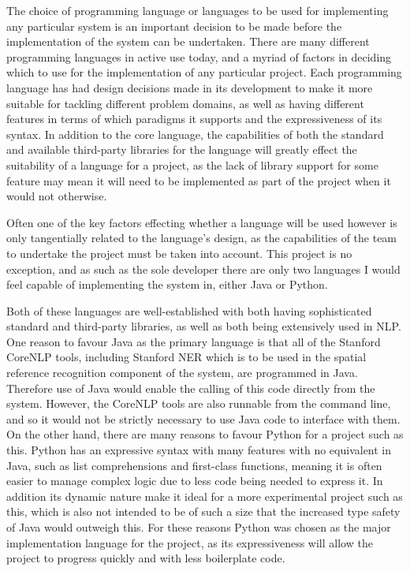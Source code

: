\documentclass[12pt, a4paper]{report}
\begin{document}
The choice of programming language or languages to be used for implementing any particular system is an important decision to be made before the implementation of the system can be undertaken. There are many different programming languages in active use today, and a myriad of factors in deciding which to use for the implementation of any particular project. Each programming language has had design decisions made in its development to make it more suitable for tackling different problem domains, as well as having different features in terms of which paradigms it supports and the expressiveness of its syntax. In addition to the core language, the capabilities of both the standard and available third-party libraries for the language will greatly effect the suitability of a language for a project, as the lack of library support for some feature may mean it will need to be implemented as part of the project when it would not otherwise.

Often one of the key factors effecting whether a language will be used however is only tangentially related to the language's design, as the capabilities of the team to undertake the project must be taken into account. This project is no exception, and as such as the sole developer there are only two languages I would feel capable of implementing the system in, either Java or Python.

Both of these languages are well-established with both having sophisticated standard and third-party libraries, as well as both being extensively used in NLP. One reason to favour Java as the primary language is that all of the Stanford CoreNLP tools, including Stanford NER which is to be used in the spatial reference recognition component of the system, are programmed in Java. Therefore use of Java would enable the calling of this code directly from the system. However, the CoreNLP tools are also runnable from the command line, and so it would not be strictly necessary to use Java code to interface with them. On the other hand, there are many reasons to favour Python for a project such as this. Python has an expressive syntax with many features with no equivalent in Java, such as list comprehensions and first-class functions, meaning it is often easier to manage complex logic due to less code being needed to express it. In addition its dynamic nature make it ideal for a more experimental project such as this, which is also not intended to be of such a size that the increased type safety of Java would outweigh this. For these reasons Python was chosen as the major implementation language for the project, as its expressiveness will allow the project to progress quickly and with less boilerplate code. 
\end{document}
